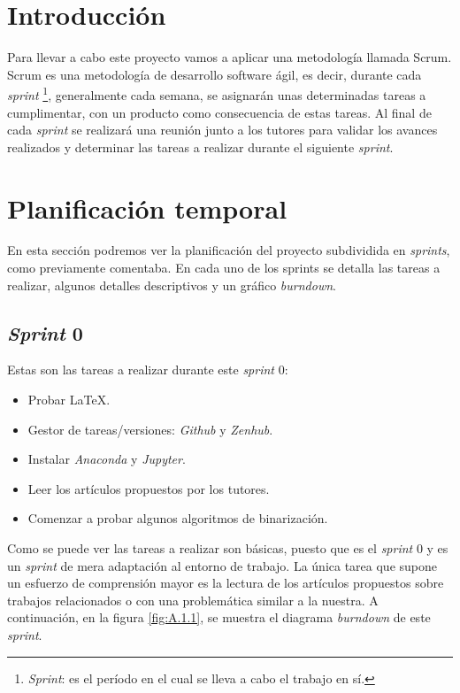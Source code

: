 
\section{Introducción}
Para llevar a cabo este proyecto vamos a aplicar una metodología llamada Scrum. Scrum es una metodología de desarrollo software ágil, es decir, durante cada \textit{sprint} \footnote{\textit{Sprint}: es el período en el cual se lleva a cabo el trabajo en sí.\cite{wiki:scrum}}, generalmente cada semana, se asignarán unas determinadas tareas a cumplimentar, con un producto como consecuencia de estas tareas. Al final de cada \textit{sprint} se realizará una reunión junto a los tutores para validar los avances realizados y determinar las tareas a realizar durante el siguiente \textit{sprint}.

\section{Planificación temporal}

En esta sección podremos ver la planificación del proyecto subdividida en \textit{sprints}, como previamente comentaba. En cada uno de los sprints se detalla las tareas a realizar, algunos detalles descriptivos y un gráfico \textit{burndown}.


\subsection{\textit{Sprint} 0}
Estas son las tareas a realizar durante este \textit{sprint} 0:

\begin{itemize}
	\item Probar \LaTeX.
	\item Gestor de tareas/versiones: \textit{Github} y \textit{Zenhub}.
	\item Instalar \textit{Anaconda} y \textit{Jupyter}.
	\item Leer los artículos propuestos por los tutores.
	\item Comenzar a probar algunos algoritmos de binarización.
\end{itemize}

Como se puede ver las tareas a realizar son básicas, puesto que es el \textit{sprint} 0 y es un \textit{sprint} de mera adaptación al entorno de trabajo. La única tarea que supone un esfuerzo de comprensión mayor es la lectura de los artículos propuestos sobre trabajos relacionados o con una problemática similar a la nuestra. A continuación, en la figura \ref{fig:A.1.1}, se muestra el diagrama \textit{burndown} de este \textit{sprint}. 


